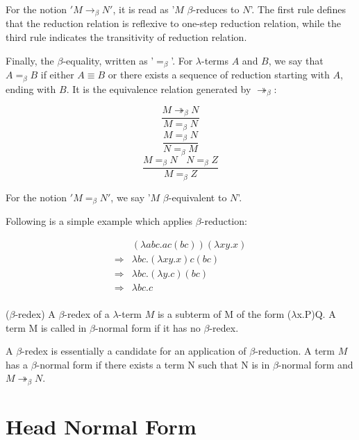 For the notion $'M\rightarrow _\beta N'$, it is read as '$M$ $\beta$-reduces to $N$'. The first rule defines that the reduction relation is reflexive to one-step reduction relation, while the third rule indicates the transitivity of reduction relation.

\noindent Finally, the $\beta$-equality, written as '$=_\beta$'. For $\lambda$-terms $A$ and $B$, we say that $A =_\beta B$ if either $A \equiv B$ or there exists a sequence of reduction starting with $A$, ending with $B$. It is the equivalence relation generated by $\twoheadrightarrow _\beta$:

\begin{equation*}
\frac{M\twoheadrightarrow _\beta N}{M = _\beta N}
\end{equation*}
\begin{equation*}
\frac{M = _\beta N}{N = _\beta M}
\end{equation*}
\begin{equation*}
\frac{M = _\beta N\ \ \ \ N = _\beta Z}{M = _\beta Z}
\end{equation*}

For the notion $'M = _\beta N'$, we say '$M$ $\beta$-equivalent to $N$'. 

\noindent Following is a simple example which applies $\beta$-reduction:

\begin{equation*}
\begin{array}{ll}
&(\lambda abc.ac(bc))(\lambda xy.x)\\
\Rightarrow& \lambda bc.(\lambda xy.x)c(bc) \\
\Rightarrow& \lambda bc.(\lambda y.c)(bc)\\
\Rightarrow& \lambda bc.c \\
\end{array}
\end{equation*}


\begin{def1}
($\beta$-redex) A $\beta$-redex of a $\lambda$-term $M$ is a subterm of M of the form ($\lambda$x.P)Q. A term M is called in $\beta$-normal form if it has no $\beta$-redex.
\end{def1}
A $\beta$-redex is essentially a candidate for an application of $\beta$-reduction. A term $M$ has a $\beta$-normal form if there exists a term N such that N is in $\beta$-normal form and $M \twoheadrightarrow _\beta N$. 

\section{Head Normal Form}


